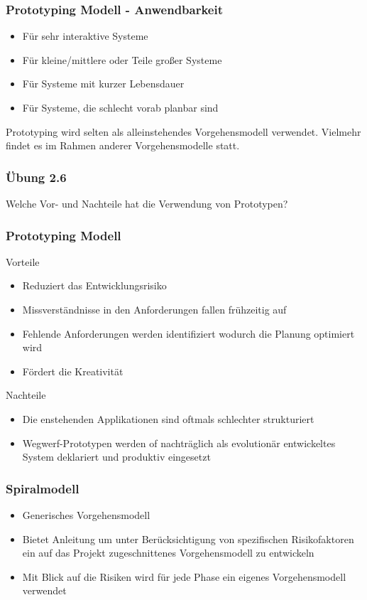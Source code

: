 \begin{frame}
\frametitle{Prototyping Modell - Anwendbarkeit}
	\begin{itemize}
		\item Für sehr interaktive Systeme
		\item Für kleine/mittlere oder Teile großer Systeme
		\item Für Systeme mit kurzer Lebensdauer
		\item Für Systeme, die schlecht vorab planbar sind
	\end{itemize}
	\bigskip
	Prototyping wird selten als alleinstehendes Vorgehensmodell verwendet.
	Vielmehr findet es im Rahmen anderer Vorgehensmodelle statt.
\end{frame}

\begin{frame}
\frametitle{Übung 2.6}
	Welche Vor- und Nachteile hat die Verwendung von Prototypen?
\end{frame}

\begin{frame}
\frametitle{Prototyping Modell}
	Vorteile
	\begin{itemize}
		\item Reduziert das Entwicklungsrisiko
		\item Missverständnisse in den Anforderungen fallen frühzeitig auf
		\item Fehlende Anforderungen werden identifiziert wodurch die Planung optimiert wird
		\item Fördert die Kreativität
	\end{itemize}
	\bigskip
	Nachteile
	\begin{itemize}
		\item Die enstehenden Applikationen sind oftmals schlechter strukturiert
		\item Wegwerf-Prototypen werden of nachträglich als evolutionär entwickeltes System deklariert 
		und produktiv eingesetzt
	\end{itemize}
\end{frame}

\begin{frame}
\frametitle{Spiralmodell}
	\begin{itemize}
		\item Generisches Vorgehensmodell
		\item Bietet Anleitung um unter Berücksichtigung von spezifischen Risikofaktoren
		ein auf das Projekt zugeschnittenes Vorgehensmodell zu entwickeln
		\item Mit Blick auf die Risiken wird für jede Phase ein eigenes Vorgehensmodell 
		verwendet
	\end{itemize}
\end{frame}

